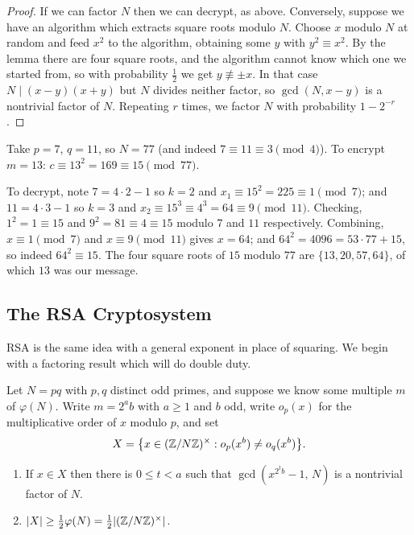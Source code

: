 \documentclass[a4paper]{scrartcl}
\begin{document}
\begin{proof}
	If we can factor $N$ then we can decrypt, as above. Conversely, suppose we have an algorithm which extracts square roots modulo $N$. Choose $x$ modulo $N$ at random and feed $x^2$ to the algorithm, obtaining some $y$ with $y^2\equiv x^2$. By the lemma there are four square roots, and the algorithm cannot know which one we started from, so with probability $\tfrac12$ we get $y\not\equiv\pm x$. In that case $N \mid (x-y)(x+y)$ but $N$ divides neither factor, so $\gcd(N,x-y)$ is a nontrivial factor of $N$. Repeating $r$ times, we factor $N$ with probability $1-2^{-r}$.
\end{proof}

\begin{example}
	Take $p = 7$, $q = 11$, so $N = 77$ (and indeed $7 \equiv 11\equiv3\pmod4$). To encrypt $m = 13$: $c \equiv 13^2 = 169 \equiv 15 \pmod{77}$.

	To decrypt, note $7 = 4\cdot2-1$ so $k = 2$ and $x_1 \equiv 15^2 = 225\equiv1\pmod7$; and $11 = 4\cdot3-1$ so $k=3$ and $x_2\equiv15^3\equiv4^3=64\equiv9\pmod{11}$. Checking, $1^2 = 1 \equiv 15$ and $9^2 = 81\equiv4\equiv15$ modulo $7$ and $11$ respectively. Combining, $x \equiv 1\pmod 7$ and $x\equiv9\pmod{11}$ gives $x = 64$; and $64^2 = 4096 = 53\cdot77+15$, so indeed $64^2\equiv15$. The four square roots of $15$ modulo $77$ are $\{13,20,57,64\}$, of which $13$ was our message.
\end{example}

\subsection{The RSA Cryptosystem}

RSA is the same idea with a general exponent in place of squaring. We begin with a factoring result which will do double duty.

Let $N = pq$ with $p,q$ distinct odd primes, and suppose we know some multiple $m$ of $\varphi(N)$. Write $m = 2^ab$ with $a \ge 1$ and $b$ odd, write $o_p(x)$ for the multiplicative order of $x$ modulo $p$, and set
$$X = \bigl\{x \in (\mathbb{Z}/N\mathbb{Z})^\times : o_p(x^b)\ne o_q(x^b)\bigr\}.$$

\begin{theorem}\label{thm:factorfromphi}
	\begin{enumerate}[label=(\roman*)]
		\item If $x \in X$ then there is $0 \le t<a$ such that $\gcd(x^{2^tb}-1,\,N)$ is a nontrivial factor of $N$.
		\item $\lvert X\rvert\ge\tfrac12\varphi(N) = \tfrac12\lvert(\mathbb{Z}/N\mathbb{Z})^\times\rvert$.
	\end{enumerate}
\end{theorem}
\end{document}

